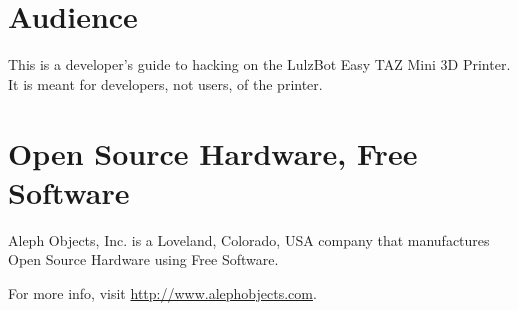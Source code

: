 %
%
%
%
%

\section{Audience}
This is a developer's guide to hacking on the LulzBot Easy TAZ Mini 3D Printer.
It is meant for developers, not users, of the printer.

\section{Open Source Hardware, Free Software}

Aleph Objects, Inc. is a Loveland, Colorado, USA company that manufactures
Open Source Hardware using Free Software.

For more info, visit \url{http://www.alephobjects.com}.

